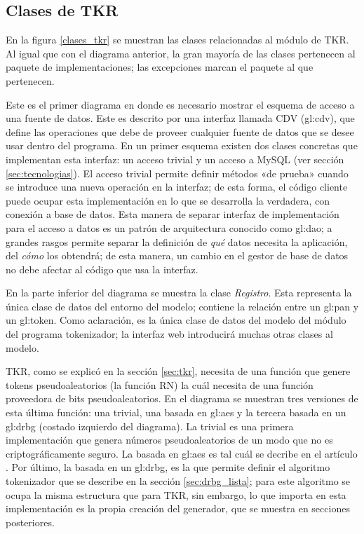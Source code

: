 %
%
%

\subsection{Clases de TKR}
\label{sec:tkr_disenio}

En la figura \ref{clases_tkr} se muestran las clases relacionadas al módulo de
TKR. Al igual que con el diagrama anterior, la gran mayoría de las clases
pertenecen al paquete de implementaciones; las excepciones marcan el paquete al
que pertenecen.

Este es el primer diagrama en donde es necesario mostrar el esquema de acceso a
una fuente de datos. Este es descrito por una interfaz llamada CDV
(\acrlong{gl:cdv}), que define las operaciones que debe de proveer cualquier
fuente de datos que se desee usar dentro del programa. En un primer esquema
existen dos clases concretas que implementan esta interfaz: un acceso trivial y
un acceso a MySQL (ver sección \ref{sec:tecnologias}). El acceso trivial permite
definir métodos «de prueba» cuando se introduce una nueva operación en la
interfaz; de esta forma, el código cliente puede ocupar esta implementación en
lo que se desarrolla la verdadera, con conexión a base de datos. Esta manera de
separar interfaz de implementación para el acceso a datos es un patrón de
arquitectura conocido como \gls{gl:dao}; a grandes rasgos permite separar la
definición de \textit{qué} datos necesita la aplicación, del \textit{cómo} los
obtendrá; de esta manera, un cambio en el gestor de base de datos no debe
afectar al código que usa la interfaz.

En la parte inferior del diagrama se muestra la clase \textit{Registro}. Esta
representa la única clase de datos del entorno del modelo; contiene la relación
entre un \gls{gl:pan} y un \gls{gl:token}. Como aclaración, es la única clase de
datos del modelo del módulo del programa tokenizador; la interfaz web
introducirá muchas otras clases al modelo.

TKR, como se explicó en la sección \ref{sec:tkr}, necesita de una función que
genere tokens pseudoaleatorios (la función RN) la cuál necesita de una función
proveedora de bits pseudoaleatorios. En el diagrama se muestran tres versiones
de esta última función: una trivial, una basada en \gls{gl:aes} y la tercera
basada en un \gls{gl:drbg} (costado izquierdo del diagrama). La trivial es una
primera implementación que genera números pseudoaleatorios de un modo que no es
criptográficamente seguro. La basada en \gls{gl:aes} es tal cuál se decribe en
el artículo \cite{doc_sandra}. Por último, la basada en un \gls{gl:drbg},
es la que permite definir el algoritmo tokenizador que se describe en la sección
\ref{sec:drbg_lista}; para este algoritmo se ocupa la misma estructura que para
TKR, sin embargo, lo que importa en esta implementación es la propia creación
del generador, que se muestra en secciones posteriores.

